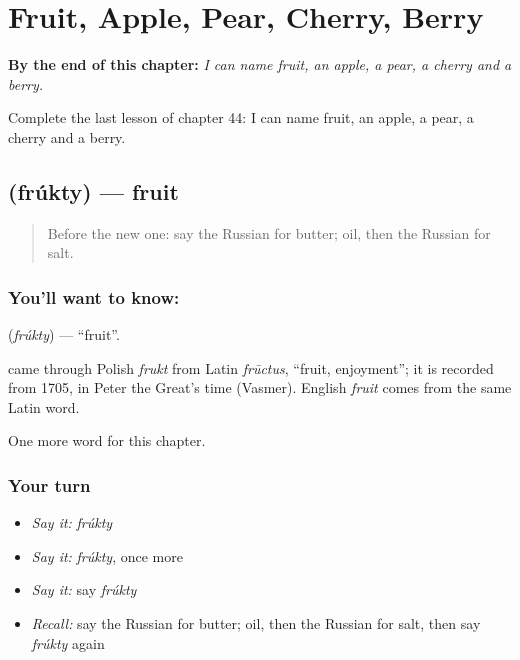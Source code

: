 
\chapter{Fruit, Apple, Pear, Cherry, Berry}
\label{ch:ru-fruit-apple-pear-cherry-berry}

\begin{chapteropening}
\textbf{By the end of this chapter:} \emph{I can name fruit, an apple, a pear, a cherry and a berry.}

Complete the last lesson of chapter 44: I can name fruit, an apple, a pear, a cherry and a berry.
\end{chapteropening}

\section[\texorpdfstring{\ru{фрукты} (frúkty)}{фрукты (frúkty)}]{ (frúkty) — fruit}

\label{lesson:RU-C44-fruit}



\begin{quote}
Before the new one: say the Russian for butter; oil, then the Russian for salt.
\end{quote}

\subsection*{You'll want to know: }
\textbf{} (\emph{frúkty}) — \textquotedblleft{}fruit\textquotedblright{}.

\begin{cousinweb}
\textbf{} came through Polish \emph{frukt} from Latin \emph{frūctus}, \textquotedblleft{}fruit, enjoyment\textquotedblright{}; it is recorded from 1705, in Peter the Great's time (Vasmer). English \emph{fruit} comes from the same Latin word.
\end{cousinweb}

\begin{grammarlens}[title={What you've built}]
One more word for this chapter.
\end{grammarlens}

\subsection*{Your turn}
\begin{itemize}
\raggedright
  \item \emph{Say it:} \emph{frúkty}
  \item \emph{Say it:} \emph{frúkty}, once more
  \item \emph{Say it:} say \emph{frúkty}
  \item \emph{Recall:} say the Russian for butter; oil, then the Russian for salt, then say \emph{frúkty} again
\end{itemize}

